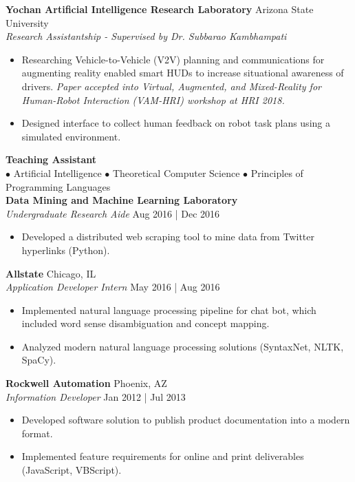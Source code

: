 \documentclass[a4paper]{article}
\begin{document}
\textbf{Yochan Artificial Intelligence Research Laboratory} \hfill Arizona State University\\
\textit{Research Assistantship - Supervised by  Dr. Subbarao Kambhampati} \hfill \\
\vspace{-1mm}
\begin{itemize} \itemsep 1pt
	\item Researching Vehicle-to-Vehicle (V2V) planning and communications for augmenting reality enabled smart HUDs to increase situational awareness of drivers. \textit{Paper accepted into Virtual, Augmented, and Mixed-Reality for Human-Robot Interaction (VAM-HRI) workshop at HRI 2018.}
    \item Designed interface to collect human feedback on robot task plans using a simulated environment.
\end{itemize}
\textbf{Teaching Assistant} \hfill \\
\vspace{1mm}
\hspace{.5cm}$\bullet$ Artificial Intelligence \-  $\bullet$ Theoretical Computer Science \-$\bullet$ Principles of Programming Languages\\
\vspace{3mm}
\textbf{Data Mining and Machine Learning Laboratory} \hfill \\
\textit{Undergraduate Research Aide} \hfill Aug 2016 | Dec 2016\\
\vspace{-1mm}
\begin{itemize} \itemsep 1pt
	\item Developed a distributed web scraping tool to mine data from Twitter hyperlinks (Python).
\end{itemize}

\textbf{Allstate} \hfill Chicago, IL\\
\textit{Application Developer Intern} \hfill May 2016 | Aug 2016\\
\vspace{-1mm}
\begin{itemize} \itemsep 1pt
	\item Implemented natural language processing pipeline for chat bot, which included word sense disambiguation and concept mapping.
	\item Analyzed modern natural language processing solutions (SyntaxNet, NLTK, SpaCy).
\end{itemize}

\textbf{Rockwell Automation} \hfill Phoenix, AZ\\
\textit{Information Developer} \hfill Jan 2012 | Jul 2013\\
\vspace{-1mm}
\begin{itemize} \itemsep 1pt
	\item Developed software solution to publish product documentation into a modern format.
	\item Implemented feature requirements for online and print deliverables (JavaScript, VBScript).
\end{itemize}
\end{document}
